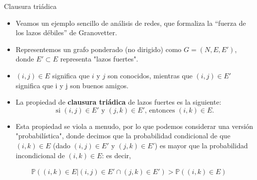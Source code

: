 \documentclass[11pt]{beamer}
\begin{document}
\begin{frame}{Clausura triádica}
    \begin{itemize}
\small        \item Veamos un ejemplo sencillo de análisis de redes, que formaliza la “fuerza de los lazos débiles” de Granovetter.
\item Representemos un grafo ponderado (no dirigido) como $G = (N,E,E')$, donde $E' \subset E$ representa "lazos fuertes".
\item $(i, j ) \in E$ significa que $i$ y $j$ son conocidos, mientras que $(i, j ) \in E'$ significa que i y j son buenos amigos.
\item La propiedad de \textbf{clausura triádica} de lazos fuertes es la siguiente:
\begin{equation*}
\text{si }(i, j) \in E'\text{ y }(j, k) \in E'\text{, entonces }(i, k ) \in E .
\end{equation*}
\item Esta propiedad se viola a menudo, por lo que podemos considerar una versión "probabilística", donde decimos que la probabilidad condicional de que $(i, k ) \in E $ (dado $(i, j) \in E'$ y $(j, k) \in E'$) es mayor que la probabilidad incondicional de $(i, k ) \in E $: es decir, 
    \end{itemize}
    \begin{equation*}
    \begin{split}
        \mathbb{P}((i, k) \in E | (i, j) \in E' \cap (j, k) \in E') > %
        \mathbb{P}((i, k) \in E)
        \end{split}
    \end{equation*}
\end{frame}
\end{document}
